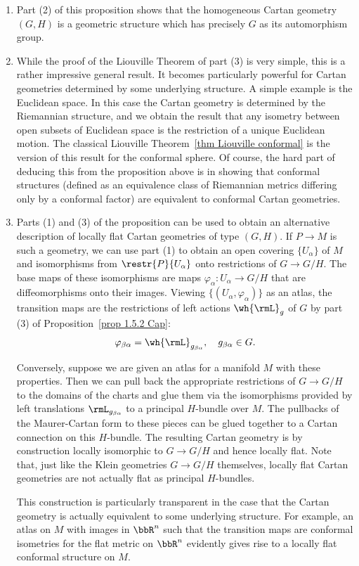 \begin{rem}\label{rem 1.5.2 Cap}
    \begin{enumerate}
        \item Part (2) of this proposition shows that the homogeneous Cartan geometry $(G,H)$ is a geometric structure which has precisely $G$ as its automorphism group.
        \item While the proof of the Liouville Theorem of part (3) is very simple, this is a rather impressive general result. It becomes particularly powerful for Cartan geometries determined by some underlying structure. A simple example is the Euclidean space. In this case the Cartan geometry is determined by the Riemannian structure, and we obtain the result that any isometry between open subsets of Euclidean space is the restriction of a unique Euclidean motion. The classical Liouville Theorem~\ref{thm Liouville conformal} is the version of this result for the conformal sphere. Of course, the hard part of deducing this from the proposition above is in showing that conformal structures (defined as an equivalence class of Riemannian metrics differing only by a conformal factor) are equivalent to conformal Cartan geometries.
        
        \item Parts (1) and (3) of the proposition can be used to obtain an alternative description of locally flat Cartan geometries of type $(G,H)$. If $P\to M$ is such a geometry, we can use part (1) to obtain an open covering $\{U_\alpha\}$ of $M$ and isomorphisms from $\restr{P}{U_\alpha}$ onto restrictions of $G\to G\slash H$. The base maps of these isomorphisms are maps $\varphi_\alpha:U_\alpha\to G\slash H$ that are diffeomorphisms onto their images. Viewing $\{(U_\alpha,\varphi_\alpha)\}$ as an atlas, the transition maps are the restrictions of left actions $\wh{\rmL}_g$ of $G$ by part (3) of Proposition~\ref{prop 1.5.2 Cap}:
        \[\varphi_{\beta\alpha}=\wh{\rmL}_{g_{\beta\alpha}},\quad g_{\beta\alpha}\in G.\]
        
        Conversely, suppose we are given an atlas for a manifold $M$ with these properties. Then we can pull back the appropriate restrictions of $G\to G\slash H$ to the domains of the charts and glue them via the isomorphisms provided by left translations $\rmL_{g_{\beta\alpha}}$ to a principal $H$-bundle over $M$. The pullbacks of the Maurer-Cartan form to these pieces can be glued together to a Cartan connection on this $H$-bundle. The resulting Cartan geometry is by construction locally isomorphic to $G\to G\slash H$ and hence locally flat. Note that, just like the Klein geometries $G\to G\slash H$ themselves, locally flat Cartan geometries are not actually flat as principal $H$-bundles.

        This construction is particularly transparent in the case that the Cartan geometry is actually equivalent to some underlying structure. For example, an atlas on $M$ with images in $\bbR^n$ such that the transition maps are conformal isometries for the flat metric on $\bbR^n$ evidently gives rise to a locally flat conformal structure on $M$.
    \end{enumerate}
\end{rem}
